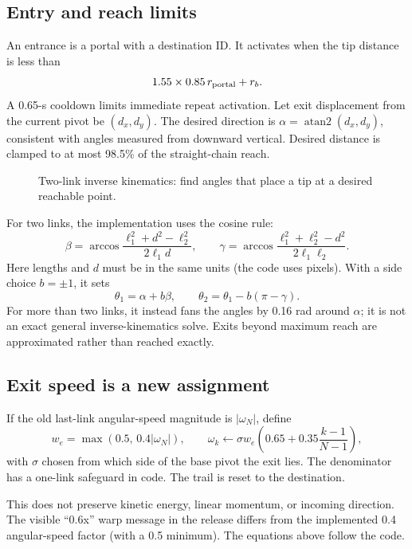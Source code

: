 \documentclass[11pt,a4paper]{article}
\begin{document}
\subsection{Entry and reach limits}
An entrance is a portal with a destination ID. It activates when the tip distance is less than
\[
 1.55\times0.85\,r_{\rm portal}+r_b.
\]
A 0.65-s cooldown limits immediate repeat activation. Let exit displacement from the current pivot be \((d_x,d_y)\). The desired direction is \(\alpha=\operatorname{atan2}(d_x,d_y)\), consistent with angles measured from downward vertical. Desired distance is clamped to at most 98.5\% of the straight-chain reach.
\begin{figure}[H]\centering
{}\caption{Two-link inverse kinematics: find angles that place a tip at a desired reachable point.}
\end{figure}
For two links, the implementation uses the cosine rule:
\[
 \beta=\arccos\frac{\ell_1^2+d^2-\ell_2^2}{2\ell_1d},\qquad
 \gamma=\arccos\frac{\ell_1^2+\ell_2^2-d^2}{2\ell_1\ell_2}.
\]
Here lengths and \(d\) must be in the same units (the code uses pixels). With a side choice \(b=\pm1\), it sets
\[
 \theta_1=\alpha+b\beta,\qquad\theta_2=\theta_1-b(\pi-\gamma).
\]
For more than two links, it instead fans the angles by 0.16 rad around \(\alpha\); it is not an exact general inverse-kinematics solve. Exits beyond maximum reach are approximated rather than reached exactly.
\subsection{Exit speed is a new assignment}
If the old last-link angular-speed magnitude is \(|\omega_N|\), define
\[
 w_e=\max(0.5,\,0.4|\omega_N|),\qquad
 \omega_k\leftarrow\sigma w_e\left(0.65+0.35\frac{k-1}{N-1}\right),
\]
with \(\sigma\) chosen from which side of the base pivot the exit lies. The denominator has a one-link safeguard in code. The trail is reset to the destination.
\begin{arcade}This does not preserve kinetic energy, linear momentum, or incoming direction. The visible ``0.6x'' warp message in the release differs from the implemented 0.4 angular-speed factor (with a 0.5 minimum). The equations above follow the code.\end{arcade}
\end{document}
